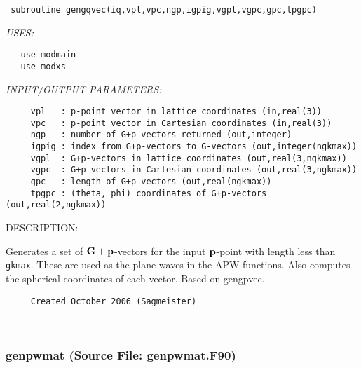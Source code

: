 \documentclass[11pt]{article}
\begin{document}
\begin{verbatim} subroutine gengqvec(iq,vpl,vpc,ngp,igpig,vgpl,vgpc,gpc,tpgpc)\end{verbatim}{\em USES:}
\begin{verbatim}   use modmain
   use modxs\end{verbatim}{\em INPUT/OUTPUT PARAMETERS:}
\begin{verbatim}     vpl   : p-point vector in lattice coordinates (in,real(3))
     vpc   : p-point vector in Cartesian coordinates (in,real(3))
     ngp   : number of G+p-vectors returned (out,integer)
     igpig : index from G+p-vectors to G-vectors (out,integer(ngkmax))
     vgpl  : G+p-vectors in lattice coordinates (out,real(3,ngkmax))
     vgpc  : G+p-vectors in Cartesian coordinates (out,real(3,ngkmax))
     gpc   : length of G+p-vectors (out,real(ngkmax))
     tpgpc : (theta, phi) coordinates of G+p-vectors (out,real(2,ngkmax))\end{verbatim}
{\sf DESCRIPTION:\\ }


     Generates a set of ${\bf G+p}$-vectors for the input ${\bf p}$-point with
     length less than {\tt gkmax}. These are used as the plane waves in the APW
     functions. Also computes the spherical coordinates of each vector.
     Based on gengpvec.
  
\begin{verbatim}     Created October 2006 (Sagmeister)\end{verbatim}






 
 
\mbox{}\hrulefill\ 
 
\subsubsection{genpwmat (Source File: genpwmat.F90)}
\end{document}
